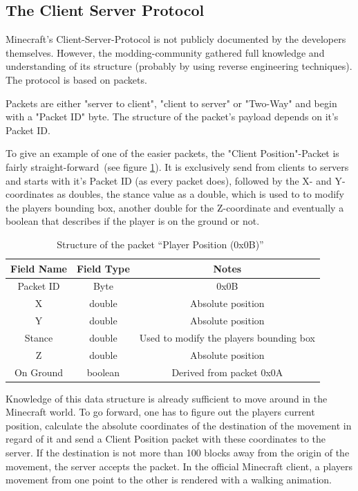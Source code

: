         \subsection{The Client Server Protocol}
Minecraft's Client-Server-Protocol is not publicly documented by the developers themselves. However, the modding-community gathered full knowledge and understanding of its structure (probably by using reverse engineering techniques). The protocol is based on packets. 

Packets are either "server to client", "client to server" or "Two-Way" and begin with a "Packet ID" byte. The structure of the packet's payload depends on it's Packet ID.
 
To give an example of one of the easier packets, the "Client Position"-Packet is fairly straight-forward~(see figure \ref{mc_packet}). It is exclusively send from clients to servers and starts with it's Packet ID (as every packet does), followed by the X- and Y-coordinates as doubles, the stance value as a double, which is used to to modify the players bounding box, another double for the Z-coordinate and eventually a boolean that describes if the player is on the ground or not.~\cite{protocol}

\begin{table}[htb]
\centering
\begin{tabular}{|c|c|c|}\hline

    Field Name & Field Type & Notes \\ \hline
   Packet ID & Byte & 0x0B \\ \hline
   X & double & Absolute position \\ \hline
   Y & double & Absolute position \\ \hline
   Stance & double & Used to modify the players bounding box \\ \hline
   Z & double & Absolute position \\ \hline
   On Ground & boolean & Derived from packet 0x0A \\ \hline
   
\end{tabular}
\caption{Structure of the packet ``Player Position (0x0B)''~\cite{protocol}}
\label{mc_packet}
\end{table}

Knowledge of this data structure is already sufficient to move around in the Minecraft world. To go forward, one has to figure out the players current position, calculate the absolute coordinates of the destination of the movement in regard of it and send a Client Position packet with these coordinates to the server. If the destination is not more than 100 blocks away from the origin of the movement, the server accepts the packet. In the official Minecraft client, a players movement from one point to the other is rendered with a walking animation.

